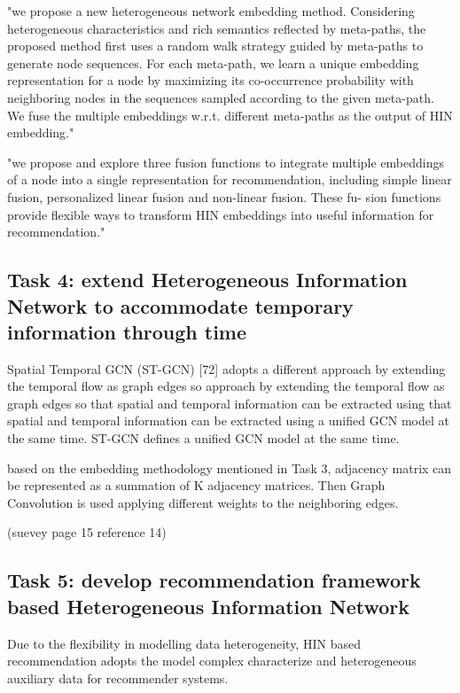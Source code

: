 \documentclass[12pt,a4 paper,title page]{article}
\begin{document}
"we propose a new heterogeneous network embedding method. Considering heterogeneous characteristics and rich semantics reflected by meta-paths, the proposed method first uses a random walk strategy guided by meta-paths to generate node sequences. For each meta-path, we learn a unique embedding representation for a node by maximizing its co-occurrence probability with neighboring nodes in the sequences sampled according to the given meta-path. We fuse the multiple embeddings w.r.t. different meta-paths as the output of HIN embedding."

"we propose and explore three fusion functions to integrate multiple embeddings of a node into a single representation for recommendation, including simple linear fusion, personalized linear fusion and non-linear fusion. These fu- sion functions provide flexible ways to transform HIN embeddings into useful information for recommendation."


\subsection{Task 4: extend Heterogeneous Information Network to accommodate temporary information through time}

Spatial Temporal GCN (ST-GCN) [72] adopts a different approach by extending the temporal flow as graph edges so
approach by extending the temporal flow as graph edges so that spatial and temporal information can be extracted using
that spatial and temporal information can be extracted using a unified GCN model at the same time. ST-GCN defines
a unified GCN model at the same time. 

based on the embedding methodology mentioned in Task 3, adjacency matrix can be represented as a summation of K adjacency matrices. Then Graph Convolution is used applying different weights to the neighboring edges.


(suevey page 15 reference 14)

\subsection{Task 5: develop recommendation framework based Heterogeneous Information Network}

Due to the flexibility in modelling data heterogeneity, HIN based recommendation adopts the model complex characterize and heterogeneous auxiliary data for recommender systems.
\end{document}

